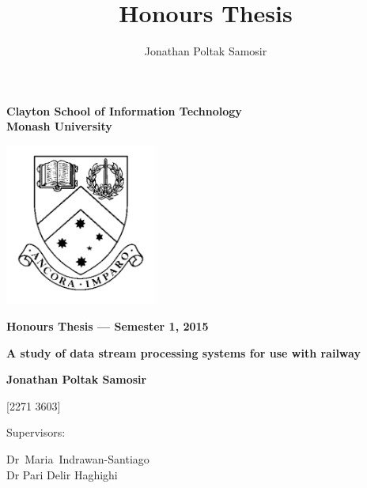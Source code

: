 \thispagestyle{empty} %
\renewcommand{\thepage}{\roman{page}}

\author{Jonathan Poltak Samosir}
\title{Honours Thesis}

\begin{spacing}{1.5}
\begin{center}
{\Large \bfseries
Clayton School of Information Technology\\
Monash University}

\vspace*{30mm}

\includegraphics[width=5cm]{img/MonashCrest.pdf}

\vspace*{15mm}

{\large \bfseries
Honours Thesis --- Semester 1, 2015
}

\vspace*{10mm}

{\LARGE \bfseries
A study of data stream processing systems for use with railway
}

\vspace*{20mm}

{\large \bfseries
Jonathan Poltak Samosir

[2271 3603]

\vspace*{20mm}

Supervisors: \parbox[t]{50mm}{\mbox{Dr Maria Indrawan-Santiago}\\Dr Pari Delir Haghighi}
}

\end{center}
\end{spacing}

\newpage


\tableofcontents

\newpage
\setcounter{page}{1}
\renewcommand{\thepage}{\arabic{page}}
